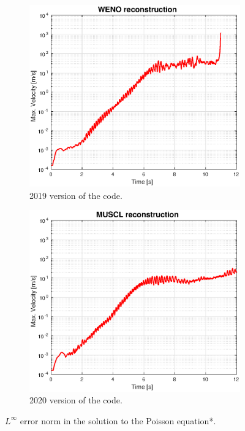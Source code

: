 \documentclass[11pt, a4paper, oneside, openany]{book}
\begin{document}
\begin{figure}[!ht]
	\centering
	\begin{subfigure}{.5\textwidth}
		\includegraphics[width=1\textwidth]{Hydrostatic_WENOTime.eps}
		\caption[Hydrostatic ]{2019 version of the code.}\label{HydrostaticTimeWENO}
	\end{subfigure}%
	\begin{subfigure}{.5\textwidth}
		\includegraphics[width=1\textwidth]{Hydrostatic_MUSCLTime.eps}
		\caption[Poisson Convergence 2020 code]{2020 version of the code.}\label{HydrostaticTimeMUSCL}
	\end{subfigure}
	\caption[Poisson equation convergence study]{$L^{\infty}$ error norm in the solution to the Poisson equation*.}\label{HydrostaticTime}
\end{figure}\noindent
\end{document}
